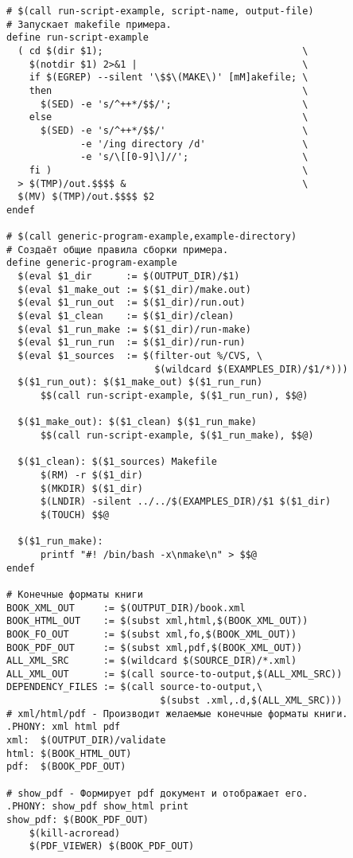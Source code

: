 \begin{verbatim}
# $(call run-script-example, script-name, output-file)
# Запускает makefile примера.
define run-script-example
  ( cd $(dir $1);                                   \
    $(notdir $1) 2>&1 |                             \
    if $(EGREP) --silent '\$$\(MAKE\)' [mM]akefile; \
    then                                            \
      $(SED) -e 's/^++*/$$/';                       \
    else                                            \
      $(SED) -e 's/^++*/$$/'                        \
             -e '/ing directory /d'                 \
             -e 's/\[[0-9]\]//';                    \
    fi )                                            \
  > $(TMP)/out.$$$$ &                               \
  $(MV) $(TMP)/out.$$$$ $2
endef

# $(call generic-program-example,example-directory)
# Создаёт общие правила сборки примера.
define generic-program-example
  $(eval $1_dir      := $(OUTPUT_DIR)/$1)
  $(eval $1_make_out := $($1_dir)/make.out)
  $(eval $1_run_out  := $($1_dir)/run.out)
  $(eval $1_clean    := $($1_dir)/clean)
  $(eval $1_run_make := $($1_dir)/run-make)
  $(eval $1_run_run  := $($1_dir)/run-run)
  $(eval $1_sources  := $(filter-out %/CVS, \
                          $(wildcard $(EXAMPLES_DIR)/$1/*)))
  $($1_run_out): $($1_make_out) $($1_run_run)
      $$(call run-script-example, $($1_run_run), $$@)

  $($1_make_out): $($1_clean) $($1_run_make)
      $$(call run-script-example, $($1_run_make), $$@)

  $($1_clean): $($1_sources) Makefile
      $(RM) -r $($1_dir)
      $(MKDIR) $($1_dir)
      $(LNDIR) -silent ../../$(EXAMPLES_DIR)/$1 $($1_dir)
      $(TOUCH) $$@

  $($1_run_make):
      printf "#! /bin/bash -x\nmake\n" > $$@
endef

# Конечные форматы книги
BOOK_XML_OUT     := $(OUTPUT_DIR)/book.xml
BOOK_HTML_OUT    := $(subst xml,html,$(BOOK_XML_OUT))
BOOK_FO_OUT      := $(subst xml,fo,$(BOOK_XML_OUT))
BOOK_PDF_OUT     := $(subst xml,pdf,$(BOOK_XML_OUT))
ALL_XML_SRC      := $(wildcard $(SOURCE_DIR)/*.xml)
ALL_XML_OUT      := $(call source-to-output,$(ALL_XML_SRC))
DEPENDENCY_FILES := $(call source-to-output,\
                           $(subst .xml,.d,$(ALL_XML_SRC)))
# xml/html/pdf - Производит желаемые конечные форматы книги.
.PHONY: xml html pdf
xml:  $(OUTPUT_DIR)/validate
html: $(BOOK_HTML_OUT)
pdf:  $(BOOK_PDF_OUT)

# show_pdf - Формирует pdf документ и отображает его.
.PHONY: show_pdf show_html print
show_pdf: $(BOOK_PDF_OUT)
    $(kill-acroread)
    $(PDF_VIEWER) $(BOOK_PDF_OUT)


\end{verbatim}
